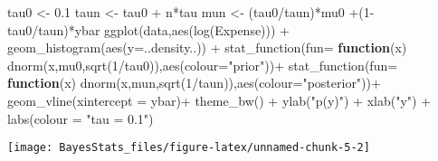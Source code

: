 \documentclass[
]{book}
\newenvironment{Shaded}{\begin{snugshade}}{\end{snugshade}}
\newcommand{\AttributeTok}[1]{\textcolor[rgb]{0.77,0.63,0.00}{#1}}
\newcommand{\ControlFlowTok}[1]{\textcolor[rgb]{0.13,0.29,0.53}{\textbf{#1}}}
\newcommand{\DecValTok}[1]{\textcolor[rgb]{0.00,0.00,0.81}{#1}}
\newcommand{\FloatTok}[1]{\textcolor[rgb]{0.00,0.00,0.81}{#1}}
\newcommand{\FunctionTok}[1]{\textcolor[rgb]{0.00,0.00,0.00}{#1}}
\newcommand{\NormalTok}[1]{#1}
\newcommand{\OtherTok}[1]{\textcolor[rgb]{0.56,0.35,0.01}{#1}}
\newcommand{\SpecialCharTok}[1]{\textcolor[rgb]{0.00,0.00,0.00}{#1}}
\newcommand{\StringTok}[1]{\textcolor[rgb]{0.31,0.60,0.02}{#1}}
\begin{document}
\begin{Shaded}
\begin{Highlighting}[]
\NormalTok{tau0 }\OtherTok{\textless{}{-}} \FloatTok{0.1}
\NormalTok{taun }\OtherTok{\textless{}{-}}\NormalTok{ tau0 }\SpecialCharTok{+}\NormalTok{ n}\SpecialCharTok{*}\NormalTok{tau}
\NormalTok{mun }\OtherTok{\textless{}{-}}\NormalTok{ (tau0}\SpecialCharTok{/}\NormalTok{taun)}\SpecialCharTok{*}\NormalTok{mu0 }\SpecialCharTok{+}\NormalTok{(}\DecValTok{1}\SpecialCharTok{{-}}\NormalTok{tau0}\SpecialCharTok{/}\NormalTok{taun)}\SpecialCharTok{*}\NormalTok{ybar}
\FunctionTok{ggplot}\NormalTok{(data,}\FunctionTok{aes}\NormalTok{(}\FunctionTok{log}\NormalTok{(Expense))) }\SpecialCharTok{+}
  \FunctionTok{geom\_histogram}\NormalTok{(}\FunctionTok{aes}\NormalTok{(}\AttributeTok{y=}\NormalTok{..density..)) }\SpecialCharTok{+}
  \FunctionTok{stat\_function}\NormalTok{(}\AttributeTok{fun=} \ControlFlowTok{function}\NormalTok{(x) }\FunctionTok{dnorm}\NormalTok{(x,mu0,}\FunctionTok{sqrt}\NormalTok{(}\DecValTok{1}\SpecialCharTok{/}\NormalTok{tau0)),}\FunctionTok{aes}\NormalTok{(}\AttributeTok{colour=}\StringTok{"prior"}\NormalTok{))}\SpecialCharTok{+}
  \FunctionTok{stat\_function}\NormalTok{(}\AttributeTok{fun=} \ControlFlowTok{function}\NormalTok{(x) }\FunctionTok{dnorm}\NormalTok{(x,mun,}\FunctionTok{sqrt}\NormalTok{(}\DecValTok{1}\SpecialCharTok{/}\NormalTok{taun)),}\FunctionTok{aes}\NormalTok{(}\AttributeTok{colour=}\StringTok{"posterior"}\NormalTok{))}\SpecialCharTok{+}
  \FunctionTok{geom\_vline}\NormalTok{(}\AttributeTok{xintercept =}\NormalTok{ ybar)}\SpecialCharTok{+}
  \FunctionTok{theme\_bw}\NormalTok{() }\SpecialCharTok{+} \FunctionTok{ylab}\NormalTok{(}\StringTok{"p(y)"}\NormalTok{) }\SpecialCharTok{+} \FunctionTok{xlab}\NormalTok{(}\StringTok{"y"}\NormalTok{) }\SpecialCharTok{+} \FunctionTok{labs}\NormalTok{(}\AttributeTok{colour =} \StringTok{"tau = 0.1"}\NormalTok{)}
\end{Highlighting}
\end{Shaded}

\begin{center}\texttt{[image: BayesStats\_files/figure-latex/unnamed-chunk-5-2]} \end{center}
\end{document}
